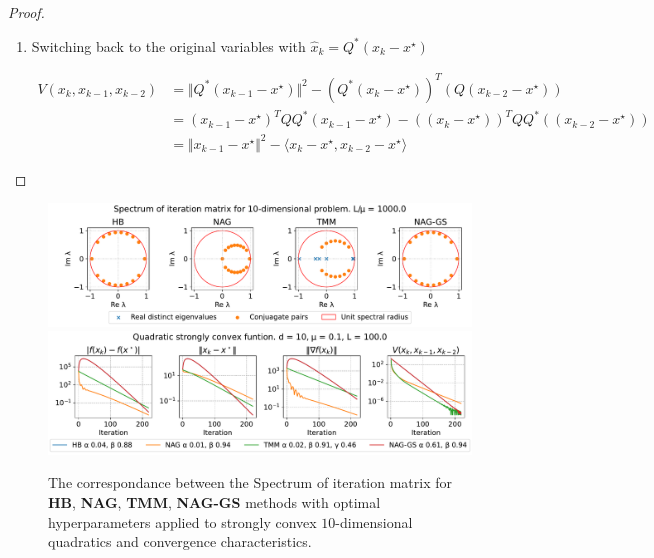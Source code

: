\documentclass[a4paper,11pt]{article}
\begin{document}
\begin{proof}
\begin{enumerate}
 \item Switching back to the original variables with $ \hat{x}_{k} = Q^*(x_k - x^\star)$
 
 \begin{equation*}
 \begin{split}
 V(x_k, x_{k-1}, x_{k-2}) &= \Vert Q^*(x_{k-1} - x^\star)\Vert ^2 -(Q^*(x_k - x^\star))^T(Q(x_{k-2} - x^\star)) \\
 &= (x_{k-1} - x^\star)^T QQ^* (x_{k-1} - x^\star) - ((x_k - x^\star))^TQQ^*((x_{k-2} - x^\star)) \\
 &= \Vert x_{k-1} - x^\star\Vert ^2 - \langle x_k - x^\star, x_{k-2} - x^\star\rangle
 \end{split}
 \end{equation*}
 \end{enumerate}
\end{proof}


\begin{figure}[h!]
 \centering
 \includegraphics[width=\linewidth]{eigenvalues_distribution.pdf}
 \includegraphics[width=\linewidth]{eigenvalues_illustration_convergence.pdf}
 \caption{The correspondance between the Spectrum of iteration matrix for \textbf{HB}, \textbf{NAG}, \textbf{TMM}, \textbf{NAG-GS} methods with optimal hyperparameters applied to strongly convex $10$-dimensional quadratics and convergence characteristics.}
 \label{oplyap:fig:eigenvalues_distribution}
\end{figure}
\end{document}
